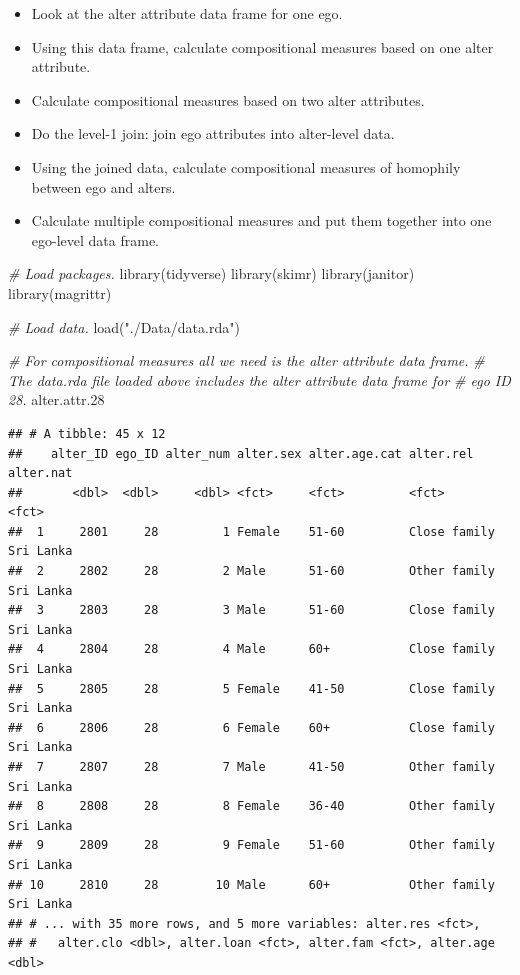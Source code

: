 \documentclass[
]{book}
\newenvironment{Shaded}{\begin{snugshade}}{\end{snugshade}}
\newcommand{\CommentTok}[1]{\textcolor[rgb]{0.56,0.35,0.01}{\textit{#1}}}
\newcommand{\FloatTok}[1]{\textcolor[rgb]{0.00,0.00,0.81}{#1}}
\newcommand{\FunctionTok}[1]{\textcolor[rgb]{0.00,0.00,0.00}{#1}}
\newcommand{\NormalTok}[1]{#1}
\newcommand{\StringTok}[1]{\textcolor[rgb]{0.31,0.60,0.02}{#1}}
\providecommand{\tightlist}{%
  \setlength{\itemsep}{0pt}\setlength{\parskip}{0pt}}
\begin{document}
\begin{itemize}
  \begin{itemize}
  \tightlist
  \item
    Look at the alter attribute data frame for one ego.
  \item
    Using this data frame, calculate compositional measures based on one alter attribute.
  \item
    Calculate compositional measures based on two alter attributes.
  \item
    Do the level-1 join: join ego attributes into alter-level data.
  \item
    Using the joined data, calculate compositional measures of homophily between ego and alters.
  \item
    Calculate multiple compositional measures and put them together into one ego-level data frame.
  \end{itemize}
\end{itemize}

\begin{Shaded}
\begin{Highlighting}[]
\CommentTok{\# Load packages.}
\FunctionTok{library}\NormalTok{(tidyverse)}
\FunctionTok{library}\NormalTok{(skimr)}
\FunctionTok{library}\NormalTok{(janitor)}
\FunctionTok{library}\NormalTok{(magrittr)}

\CommentTok{\# Load data.}
\FunctionTok{load}\NormalTok{(}\StringTok{"./Data/data.rda"}\NormalTok{)}

\CommentTok{\# For compositional measures all we need is the alter attribute data frame.}
\CommentTok{\# The data.rda file loaded above includes the alter attribute data frame for}
\CommentTok{\# ego ID 28.}
\NormalTok{alter.attr}\FloatTok{.28}
\end{Highlighting}
\end{Shaded}

\begin{verbatim}
## # A tibble: 45 x 12
##    alter_ID ego_ID alter_num alter.sex alter.age.cat alter.rel    alter.nat
##       <dbl>  <dbl>     <dbl> <fct>     <fct>         <fct>        <fct>    
##  1     2801     28         1 Female    51-60         Close family Sri Lanka
##  2     2802     28         2 Male      51-60         Other family Sri Lanka
##  3     2803     28         3 Male      51-60         Close family Sri Lanka
##  4     2804     28         4 Male      60+           Close family Sri Lanka
##  5     2805     28         5 Female    41-50         Close family Sri Lanka
##  6     2806     28         6 Female    60+           Close family Sri Lanka
##  7     2807     28         7 Male      41-50         Other family Sri Lanka
##  8     2808     28         8 Female    36-40         Other family Sri Lanka
##  9     2809     28         9 Female    51-60         Other family Sri Lanka
## 10     2810     28        10 Male      60+           Other family Sri Lanka
## # ... with 35 more rows, and 5 more variables: alter.res <fct>,
## #   alter.clo <dbl>, alter.loan <fct>, alter.fam <fct>, alter.age <dbl>
\end{verbatim}
\end{document}
